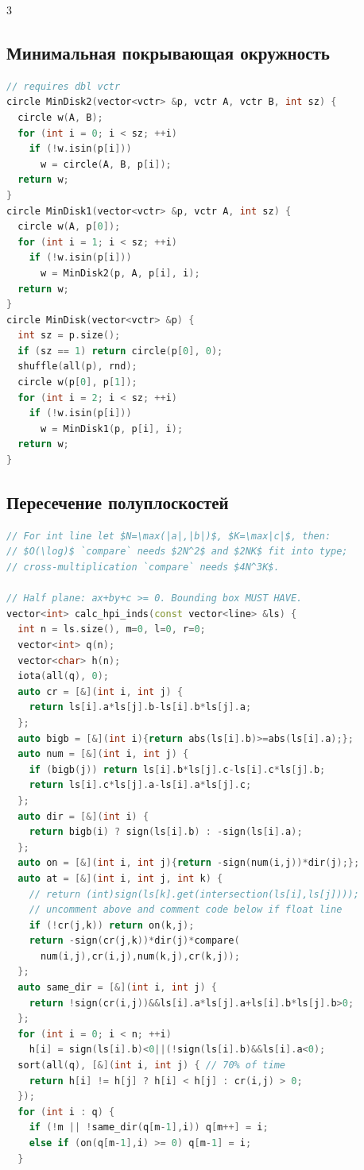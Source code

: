 \documentclass[8pt,a4paper,landscape,twosided]{extarticle}
\begin{document}
\begin{multicols*}{3}
\subsection{Минимальная покрывающая окружность}
\begin{lstlisting}[language=C++]
// requires dbl vctr
circle MinDisk2(vector<vctr> &p, vctr A, vctr B, int sz) {
  circle w(A, B);
  for (int i = 0; i < sz; ++i)
    if (!w.isin(p[i]))
      w = circle(A, B, p[i]);
  return w;
}
circle MinDisk1(vector<vctr> &p, vctr A, int sz) {
  circle w(A, p[0]);
  for (int i = 1; i < sz; ++i)
    if (!w.isin(p[i]))
      w = MinDisk2(p, A, p[i], i);
  return w;
}
circle MinDisk(vector<vctr> &p) {
  int sz = p.size();
  if (sz == 1) return circle(p[0], 0);
  shuffle(all(p), rnd);
  circle w(p[0], p[1]);
  for (int i = 2; i < sz; ++i)
    if (!w.isin(p[i]))
      w = MinDisk1(p, p[i], i);
  return w;
}
\end{lstlisting}

\subsection{Пересечение полуплоскостей}
\begin{lstlisting}[language=C++]
// For int line let $N=\max(|a|,|b|)$, $K=\max|c|$, then:
// $O(\log)$ `compare` needs $2N^2$ and $2NK$ fit into type;
// cross-multiplication `compare` needs $4N^3K$.

// Half plane: ax+by+c >= 0. Bounding box MUST HAVE.
vector<int> calc_hpi_inds(const vector<line> &ls) {
  int n = ls.size(), m=0, l=0, r=0;
  vector<int> q(n);
  vector<char> h(n);
  iota(all(q), 0);
  auto cr = [&](int i, int j) {
    return ls[i].a*ls[j].b-ls[i].b*ls[j].a;
  };
  auto bigb = [&](int i){return abs(ls[i].b)>=abs(ls[i].a);};
  auto num = [&](int i, int j) {
    if (bigb(j)) return ls[i].b*ls[j].c-ls[i].c*ls[j].b;
    return ls[i].c*ls[j].a-ls[i].a*ls[j].c;
  };
  auto dir = [&](int i) {
    return bigb(i) ? sign(ls[i].b) : -sign(ls[i].a);
  };
  auto on = [&](int i, int j){return -sign(num(i,j))*dir(j);};
  auto at = [&](int i, int j, int k) {
    // return (int)sign(ls[k].get(intersection(ls[i],ls[j])));
    // uncomment above and comment code below if float line
    if (!cr(j,k)) return on(k,j);
    return -sign(cr(j,k))*dir(j)*compare(
      num(i,j),cr(i,j),num(k,j),cr(k,j));
  };
  auto same_dir = [&](int i, int j) {
    return !sign(cr(i,j))&&ls[i].a*ls[j].a+ls[i].b*ls[j].b>0;
  };
  for (int i = 0; i < n; ++i)
    h[i] = sign(ls[i].b)<0||(!sign(ls[i].b)&&ls[i].a<0);
  sort(all(q), [&](int i, int j) { // 70% of time
    return h[i] != h[j] ? h[i] < h[j] : cr(i,j) > 0;
  });
  for (int i : q) {
    if (!m || !same_dir(q[m-1],i)) q[m++] = i;
    else if (on(q[m-1],i) >= 0) q[m-1] = i;
  }


\end{lstlisting}
\end{multicols*}
\end{document}
